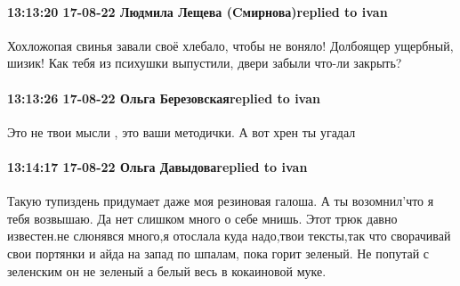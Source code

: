  
 
 
 
 


\paragraph{13:13:20 17-08-22 Людмила Лещева (Cмирнова)replied to ivan}

Хохложопая свинья завали своё хлебало, чтобы не воняло!
Долбоящер ущербный, шизик!
Как тебя из психушки выпустили, двери забыли что-ли закрыть?

\paragraph{13:13:26 17-08-22 Ольга Березовскаяreplied to ivan}

Это не твои мысли , это ваши методички. А вот хрен ты угадал

\paragraph{13:14:17 17-08-22 Ольга Давыдоваreplied to ivan}

Такую тупиздень придумает даже моя резиновая галоша. А ты возомнил'что я тебя
возвышаю. Да нет слишком много о себе мнишь. Этот трюк давно известен.не
слюнявся много,я отослала куда надо,твои тексты,так что сворачивай свои
портянки и айда на запад по шпалам, пока горит зеленый. Не попутай с зеленским
он не зеленый а белый весь в кокаиновой муке.
